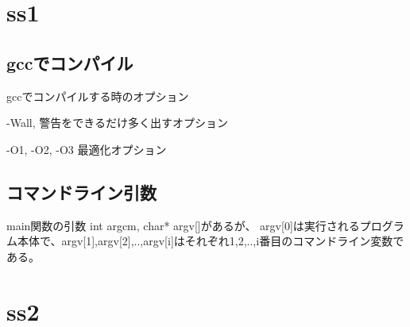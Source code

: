 \section{ss1}

\subsection{gccでコンパイル}

gccでコンパイルする時のオプション

-Wall, 警告をできるだけ多く出すオプション

-O1, -O2, -O3 最適化オプション

\subsection{コマンドライン引数}

main関数の引数 int argcm, char* argv[]があるが、
argv[0]は実行されるプログラム本体で、argv[1],argv[2],..,argv[i]はそれぞれ1,2,..,i番目のコマンドライン変数である。 

\section{ss2}


